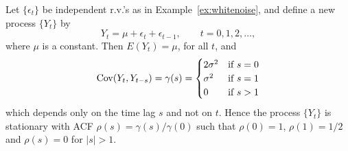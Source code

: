 \begin{ex} \label{ex:movingaverage} Let $\{ \epsilon_t \}$ be independent r.v.'s as in Example~\ref{ex:whitenoise}, and define a new process $\{ Y_t \}$ by
	\[
	Y_t = \mu + \epsilon_t + \epsilon_{t-1}, \qquad t=0, 1, 2, \ldots,
	\]
where $\mu$ is a constant.  Then $E(Y_t)= \mu$, for all $t$, and
	\[
	\operatorname{Cov}(Y_t,Y_{t-s})= \gamma(s) =
	\begin{cases}
	2 \sigma^2 & \text{if } s= 0 \\
	\sigma^2 & \text{if } s= 1 \\
	0 & \text{if } s > 1
	\end{cases}
	\]
which depends only on the time lag $s$ and not on $t$.  Hence the process $\{ Y_t \}$ is stationary with ACF $\rho(s)= \gamma(s)/\gamma(0)$ such that $\rho(0)= 1$, $\rho(1)= 1/2$ and $\rho(s)= 0$ for $|s|>1$.
 

\end{ex}
